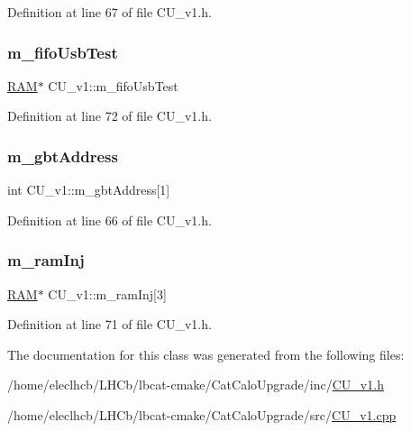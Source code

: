 Definition at line 67 of file C\+U\+\_\+v1.\+h.

\mbox{\label{classCU__v1_a87ad8f5f9ecaf5f0f70b25206e99c8e1}} 
\subsubsection{\texorpdfstring{m\+\_\+fifo\+Usb\+Test}{m\_fifoUsbTest}}
{\footnotesize\ttfamily \hyperlink{classRAM}{R\+AM}$\ast$ C\+U\+\_\+v1\+::m\+\_\+fifo\+Usb\+Test\hspace{0.3cm}{\ttfamily [private]}}



Definition at line 72 of file C\+U\+\_\+v1.\+h.

\mbox{\label{classCU__v1_a108ebddb690763d5c99dd14021fd4851}} 
\subsubsection{\texorpdfstring{m\+\_\+gbt\+Address}{m\_gbtAddress}}
{\footnotesize\ttfamily int C\+U\+\_\+v1\+::m\+\_\+gbt\+Address\mbox{[}1\mbox{]}\hspace{0.3cm}{\ttfamily [private]}}



Definition at line 66 of file C\+U\+\_\+v1.\+h.

\mbox{\label{classCU__v1_aa662d0f99787a174650fc92fb55dbb06}} 
\subsubsection{\texorpdfstring{m\+\_\+ram\+Inj}{m\_ramInj}}
{\footnotesize\ttfamily \hyperlink{classRAM}{R\+AM}$\ast$ C\+U\+\_\+v1\+::m\+\_\+ram\+Inj\mbox{[}3\mbox{]}\hspace{0.3cm}{\ttfamily [private]}}



Definition at line 71 of file C\+U\+\_\+v1.\+h.



The documentation for this class was generated from the following files\+:\begin{DoxyCompactItemize}
\item 
/home/eleclhcb/\+L\+H\+Cb/lbcat-\/cmake/\+Cat\+Calo\+Upgrade/inc/\hyperlink{CU__v1_8h}{C\+U\+\_\+v1.\+h}\item 
/home/eleclhcb/\+L\+H\+Cb/lbcat-\/cmake/\+Cat\+Calo\+Upgrade/src/\hyperlink{CU__v1_8cpp}{C\+U\+\_\+v1.\+cpp}\end{DoxyCompactItemize}
